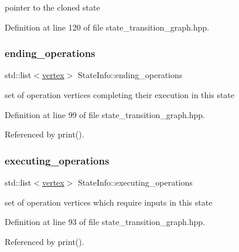 pointer to the cloned state 



Definition at line 120 of file state\+\_\+transition\+\_\+graph.\+hpp.

\mbox{\label{structStateInfo_a85b521a26e34394aabb7c38f742a95cf}} 
\subsubsection{\texorpdfstring{ending\+\_\+operations}{ending\_operations}}
{\footnotesize\ttfamily std\+::list$<$\hyperlink{graph_8hpp_abefdcf0544e601805af44eca032cca14}{vertex}$>$ State\+Info\+::ending\+\_\+operations}



set of operation vertices completing their execution in this state 



Definition at line 99 of file state\+\_\+transition\+\_\+graph.\+hpp.



Referenced by print().

\mbox{\label{structStateInfo_adfebba4a9da0a2f3c77f198a53055076}} 
\subsubsection{\texorpdfstring{executing\+\_\+operations}{executing\_operations}}
{\footnotesize\ttfamily std\+::list$<$\hyperlink{graph_8hpp_abefdcf0544e601805af44eca032cca14}{vertex}$>$ State\+Info\+::executing\+\_\+operations}



set of operation vertices which require inputs in this state 



Definition at line 93 of file state\+\_\+transition\+\_\+graph.\+hpp.



Referenced by print().

\mbox{\label{structStateInfo_af1ebd3667e849e900bdafec726887adc}} 
